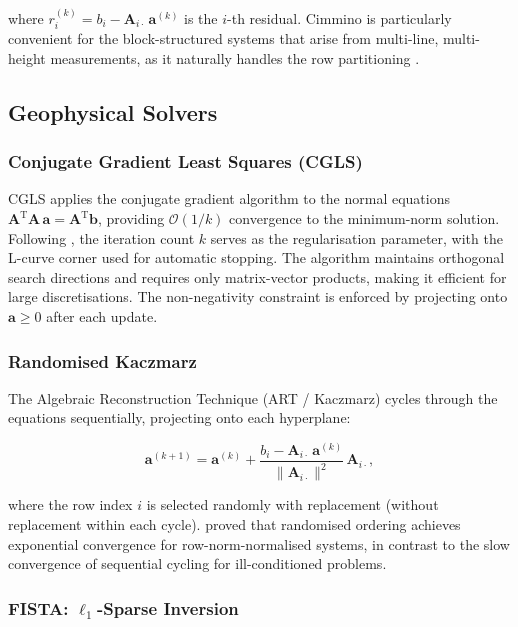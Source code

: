 \documentclass[a4paper,11pt]{article}
\begin{document}
where $r_i^{(k)} = b_i - \bm{A}_{i\cdot}\,\bm{a}^{(k)}$ is the $i$-th residual.
Cimmino is particularly convenient for the block-structured systems that
arise from multi-line, multi-height measurements, as it naturally
handles the row partitioning \citep{hansen1998rank}.

\subsection{Geophysical Solvers}

\subsubsection{Conjugate Gradient Least Squares (CGLS)}

CGLS applies the conjugate gradient algorithm to the normal equations
$\bm{A}^\mathrm{T}\bm{A}\,\bm{a} = \bm{A}^\mathrm{T}\bm{b}$, providing $\mathcal{O}(1/k)$
convergence to the minimum-norm solution.  Following
\citet{chen2024adaptive}, the iteration count $k$ serves as the
regularisation parameter, with the L-curve corner used for automatic
stopping.  The algorithm maintains orthogonal search directions and
requires only matrix-vector products, making it efficient for large
discretisations.  The non-negativity constraint is enforced by projecting
onto $\bm{a} \geq 0$ after each update.

\subsubsection{Randomised Kaczmarz}

The Algebraic Reconstruction Technique (ART / Kaczmarz) cycles through
the equations sequentially, projecting onto each hyperplane:

\begin{equation}
  \bm{a}^{(k+1)} = \bm{a}^{(k)} + \frac{b_i - \bm{A}_{i\cdot}\,\bm{a}^{(k)}}{\|\bm{A}_{i\cdot}\|^2}\,\bm{A}_{i\cdot},
\end{equation}

where the row index $i$ is selected randomly with replacement (without
replacement within each cycle).  \citet{strohmer2009randomized} proved
that randomised ordering achieves exponential convergence for
row-norm-normalised systems, in contrast to the slow convergence of
sequential cycling for ill-conditioned problems.

\subsubsection{FISTA: $\ell_1$-Sparse Inversion}
\end{document}
